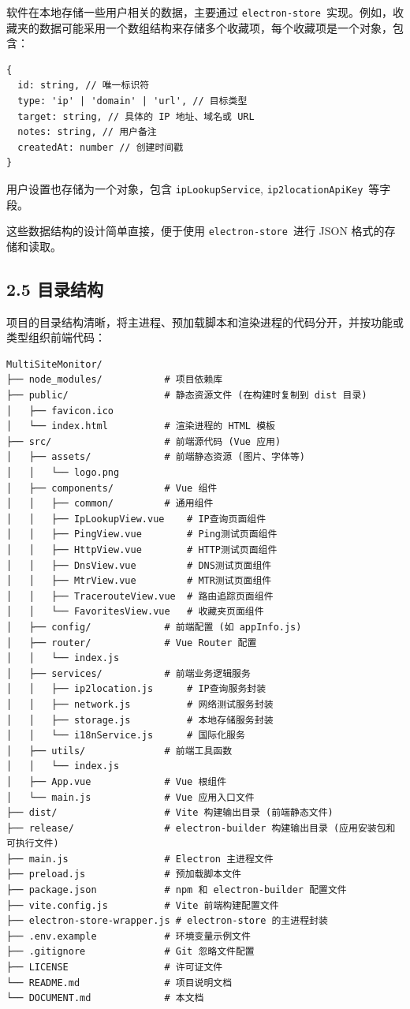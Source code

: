 \documentclass{article}
\begin{document}
软件在本地存储一些用户相关的数据，主要通过 \texttt{electron-store}\ 实现。例如，收藏夹的数据可能采用一个数组结构来存储多个收藏项，每个收藏项是一个对象，包含：

\begin{verbatim}
{
  id: string, // 唯一标识符
  type: 'ip' | 'domain' | 'url', // 目标类型
  target: string, // 具体的 IP 地址、域名或 URL
  notes: string, // 用户备注
  createdAt: number // 创建时间戳
}
\end{verbatim}

用户设置也存储为一个对象，包含 \texttt{ipLookupService}, \texttt{ip2locationApiKey}\ 等字段。

这些数据结构的设计简单直接，便于使用 \texttt{electron-store}\ 进行 JSON 格式的存储和读取。

\subsection*{2.5 目录结构}

项目的目录结构清晰，将主进程、预加载脚本和渲染进程的代码分开，并按功能或类型组织前端代码：

\begin{verbatim}
MultiSiteMonitor/
├── node_modules/           # 项目依赖库
├── public/                 # 静态资源文件 (在构建时复制到 dist 目录)
│   ├── favicon.ico
│   └── index.html          # 渲染进程的 HTML 模板
├── src/                    # 前端源代码 (Vue 应用)
│   ├── assets/             # 前端静态资源 (图片、字体等)
│   │   └── logo.png
│   ├── components/         # Vue 组件
│   │   ├── common/         # 通用组件
│   │   ├── IpLookupView.vue    # IP查询页面组件
│   │   ├── PingView.vue        # Ping测试页面组件
│   │   ├── HttpView.vue        # HTTP测试页面组件
│   │   ├── DnsView.vue         # DNS测试页面组件
│   │   ├── MtrView.vue         # MTR测试页面组件
│   │   ├── TracerouteView.vue  # 路由追踪页面组件
│   │   └── FavoritesView.vue   # 收藏夹页面组件
│   ├── config/             # 前端配置 (如 appInfo.js)
│   ├── router/             # Vue Router 配置
│   │   └── index.js
│   ├── services/           # 前端业务逻辑服务
│   │   ├── ip2location.js      # IP查询服务封装
│   │   ├── network.js          # 网络测试服务封装
│   │   ├── storage.js          # 本地存储服务封装
│   │   └── i18nService.js      # 国际化服务
│   ├── utils/              # 前端工具函数
│   │   └── index.js
│   ├── App.vue             # Vue 根组件
│   └── main.js             # Vue 应用入口文件
├── dist/                   # Vite 构建输出目录 (前端静态文件)
├── release/                # electron-builder 构建输出目录 (应用安装包和可执行文件)
├── main.js                 # Electron 主进程文件
├── preload.js              # 预加载脚本文件
├── package.json            # npm 和 electron-builder 配置文件
├── vite.config.js          # Vite 前端构建配置文件
├── electron-store-wrapper.js # electron-store 的主进程封装
├── .env.example            # 环境变量示例文件
├── .gitignore              # Git 忽略文件配置
├── LICENSE                 # 许可证文件
└── README.md               # 项目说明文档
└── DOCUMENT.md             # 本文档
\end{verbatim}
\end{document}
